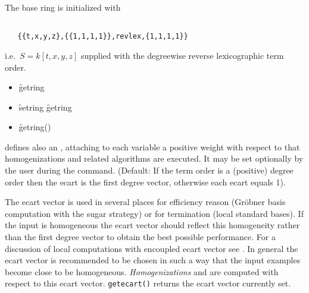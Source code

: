The base ring is initialized with
\begin{verbatim}

   {{t,x,y,z},{{1,1,1,1}},revlex,{1,1,1,1}}
\end{verbatim}
i.e.\ $S=k[t,x,y,z]$ supplied with the degreewise reverse
lexicographic term order.
\begin{itemize}
\item[]
\begin{syntax}
    \f{getring} 
\end{syntax}
\hypertarget{operator:GETRING}{}

\item[]
\begin{syntax}
    \f{setring} \f{getring} 
\end{syntax}
\hypertarget{operator:SETRING}{}

\item[]
  \begin{syntax}
    \f{getring}()
  \end{syntax}
\end{itemize}

 defines also an , attaching to each variable a
positive weight with respect to that homogenizations and related
algorithms are executed. It may be set optionally by the user during
the  command.  (Default: If the term order is a
(positive) degree order then the ecart is the first degree vector,
otherwise each ecart equals 1).

The ecart vector is used in several places for efficiency reason (Gr\"obner
basis computation with the sugar strategy) or for termination (local
standard bases). If the input is homogeneous the ecart vector should
reflect this homogeneity rather than the first degree vector to
obtain the best possible performance. For a discussion of local
computations with encoupled ecart vector see \cite{Graebe:94}. In general
the ecart vector is recommended to be chosen in such a way that the
input examples become close to be homogeneous. \emph{Homogenizations}
and  are computed with respect to this ecart
vector.
\medskip
\hypertarget{operator:GETECART}{}
\texttt{getecart()}  returns the ecart vector
currently set.


